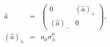 \documentclass[preprint2]{aastex63}
\newcommand\aastex{AAS\TeX}
\begin{document}
\begin{eqnarray}
\hat a & = & \left(
\begin{array}{cc}
0 & (\hat a)_+\\
(\hat a)_- & 0
\end{array}\right), \nonumber \\
(\hat a)_\pm & = & a_\mu\sigma^\mu_\pm 
\end{eqnarray}


%
%
%
\end{document}
